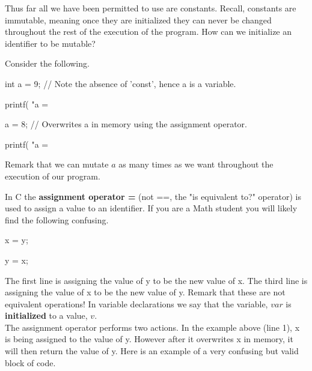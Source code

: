 Thus far all we have been permitted to use are constants. Recall, constants are immutable, meaning once they are initialized they can never be changed throughout the rest of the execution of the program. How can we initialize an identifier to be mutable?\\


Consider the following.\\

\begin{code}[c]
int a = 9; // Note the absence of 'const', hence a is a variable.

printf( "a = %

a = 8; // Overwrites a in memory using the assignment operator.

printf( "a = %
\end{code}

Remark that we can mutate $a$ as many times as we want throughout the execution of our program.\\



In C the \textbf{assignment operator =} (not ==, the "is equivalent to?" operator) is used to assign a value to an identifier. If you are a Math student you will likely find the following confusing.\\

\begin{code}[c]
x = y;

y = x;
\end{code}

The first line is assigning the value of y to be the new value of x. The third line is assigning the value of x to be the new value of y. Remark that these are not equivalent operations! In variable declarations we say that the variable, $var$ is \textbf{initialized} to a value, $v$.\\

The assignment operator performs two actions. In the example above (line 1), x is being assigned to the value of y. However after it overwrites x in memory, it will then return the value of y. Here is an example of a very confusing but valid block of code.\\

